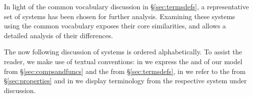 \documentclass{sig-alternate}
\begin{document}
In light of the common vocabulary discussion in \S\ref{sec:termsdefs}, a
representative set of \pilot systems has been chosen for further analysis.
Examining these \pilot systems using the common vocabulary exposes their core
similarities, and allows a detailed analysis of their differences.

The now following discussion of \pilot systems is ordered alphabetically. To
assist the reader, we make use of textual conventions: in  we
express the  and  of our model
from \S\ref{sec:compsandfuncs} and the  from
\S\ref{sec:termsdefs}, in  we refer to the  from
\S\ref{sec:properties} and in  we display terminology from
the respective \pilot system under discussion.

\end{document}
